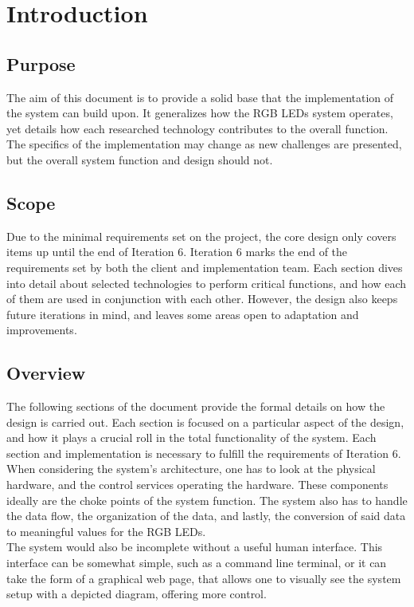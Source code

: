 	\section{Introduction}

		\subsection{Purpose}
		The aim of this document is to provide a solid base that the implementation of the system can build upon. It generalizes how the RGB LEDs system
		operates, yet details how each researched technology contributes to the overall function. The specifics of the implementation may change as new
		challenges are presented, but the overall system function and design should not.

		\subsection{Scope}
		Due to the minimal requirements set on the project, the core design only covers items up until the end of Iteration 6. Iteration 6 marks the end of the
		requirements set by both the client and implementation team. Each section dives into detail	about selected technologies to perform critical functions,
		and how each of them are used in conjunction with each other. However, the design also keeps future iterations in mind, and leaves some areas open to
		adaptation and improvements.

		\subsection{Overview}
		The following sections of the document provide the formal details on how the design is carried out. Each section is focused on a particular aspect of the
		design, and how it plays a crucial roll in the total functionality of the system. Each section and implementation is necessary to fulfill the requirements of
		Iteration 6.\\

		\noindent When considering the system's architecture, one has to look at the physical hardware, and the control services operating the hardware. These components
		ideally are the choke points of the system function. The system also has to handle the data flow, the organization of the data, and lastly, the
		conversion of said data to meaningful values for the RGB LEDs.\\

		\noindent The system would also be incomplete without a useful human interface. This interface can be somewhat simple, such as a command line terminal, or it can
		take the form of a graphical web page, that allows one to visually see the system setup with a depicted diagram, offering more control.


